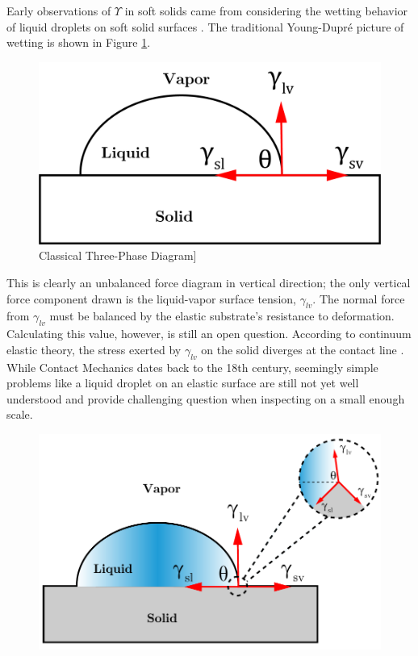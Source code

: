 Early observations of $ \Upsilon $ in soft solids came from considering the wetting behavior of liquid droplets on soft solid surfaces \cite{xu2017direct,jerison2011deformation,style2013universal,xu2018surface}. The traditional Young-Dupr\'{e} picture of wetting is shown in Figure \ref{fig:three-phase}.
\begin{figure}[h!]
	\centering
	\includegraphics[width=.6\textwidth]{Chapters/Figures/phase_diagram.PNG}
	\caption[Three-Phase Diagram]{Classical Three-Phase Diagram]}
	\label{fig:three-phase} 
\end{figure}
This is clearly an unbalanced force diagram in vertical direction; the only vertical force component drawn is the liquid-vapor surface tension, $ \gamma_{lv} $. The normal force from $\gamma_{lv}$ must be balanced by the elastic substrate's resistance to deformation. Calculating this value, however, is still an open question. According to continuum elastic theory, the stress exerted by $\gamma_{lv}$ on the solid diverges at the contact line \cite{jerison2011deformation}. While Contact Mechanics dates back to the 18th century, seemingly simple problems like a liquid droplet on an elastic surface are still not yet well understood and provide challenging question when inspecting on a small enough scale. 

\begin{figure}[h!]
	\centering
	\includegraphics[width=.6\textwidth]{Chapters/Figures/phase_diagram}
	\label{fig:three-phase-zoomed} 
\end{figure}


